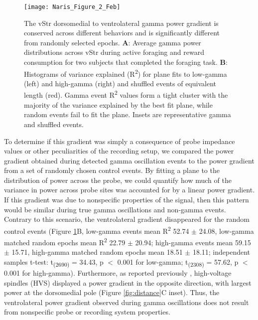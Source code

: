 \documentclass[11pt]{article}
\newcommand{\bsf}[1]{\textbf{#1}}
\let\cite=\citep
\begin{document}
\begin{figure}[h]
\centering
\texttt{[image: Naris\_Figure\_2\_Feb]}
\caption{The vStr dorsomedial to ventrolateral gamma power gradient is
  conserved across different behaviors and is significantly different
  from randomly selected epochs.  \bsf{A}: Average gamma power
  distributions across vStr during active foraging and reward
  consumption for two subjects that completed the foraging
  task. \bsf{B}: Histograms of variance explained
  (R\textsuperscript{2}) for plane fits to low-gamma (left) and
  high-gamma (right) and shuffled events of equivalent length
  (red). Gamma event R\textsuperscript{2} values form a tight cluster
  with the majority of the variance explained by the best fit plane,
  while random events fail to fit the plane. Insets are representative
  gamma and shuffled events.}
\label{fig:plane}
\end{figure}

To determine if this gradient was simply a consequence of probe
impedance values or other peculiarities of the recording setup, we
compared the power gradient obtained during detected gamma oscillation
events to the power gradient from a set of randomly chosen control
events. By fitting a plane to the distribution of power across the
probe, we could quantify how much of the variance in power across
probe sites was accounted for by a linear power gradient. If this
gradient was due to nonspecific properties of the signal, then this
pattern would be similar during true gamma oscillations and non-gamma
events. Contrary to this scenario, the ventrolateral gradient
disappeared for the random control events (Figure \ref{fig:plane}B,
low-gamma events mean R\textsuperscript{2} 52.74 $\pm$ 24.08,
low-gamma matched random epochs mean R\textsuperscript{2} 22.79 $\pm$
20.94; high-gamma events mean 59.15 $\pm$ 15.71, high-gamma matched
random epochs mean 18.51 $\pm$ 18.11; independent samples t-test:
t\textsubscript{(2690)} = 34.43, p $<$ 0.001 for low-gamma;
t\textsubscript{(2308)} = 57.62, p $<$ 0.001 for
high-gamma). Furthermore, as reported previously \cite{Berke2004a},
high-voltage spindles (HVS) displayed a power gradient in the opposite
direction, with largest power at the dorsomedial pole (Figure
\ref{fig:distance}C inset). Thus, the ventrolateral power gradient
observed during gamma oscillations does not result from nonspecific
probe or recording system properties.
\end{document}
